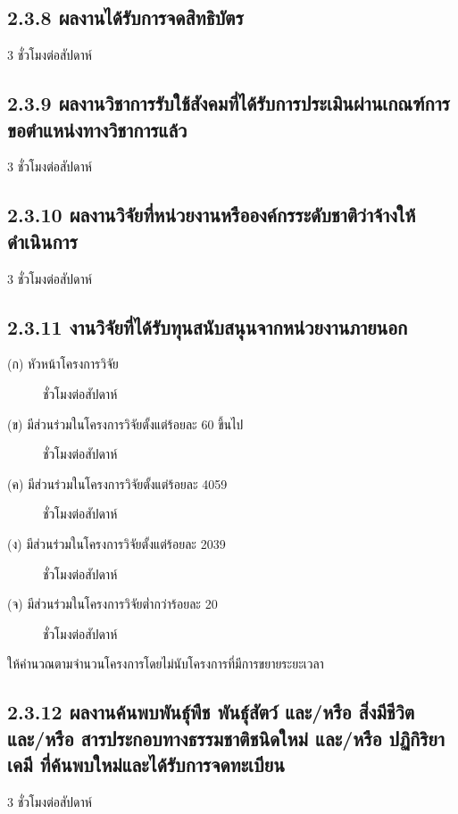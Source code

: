 \documentclass[a4paper,12pt,english]{sphinxmanual}
\begin{document}
\subsection{2.3.8 ผลงานได้รับการจดสิทธิบัตร}
\label{\detokenize{2research:id18}}
3 ชั่วโมงต่อสัปดาห์


\subsection{2.3.9 ผลงานวิชาการรับใช้สังคมที่ได้รับการประเมินผ่านเกณฑ์การขอตำแหน่งทางวิชาการแล้ว}
\label{\detokenize{2research:id19}}
3 ชั่วโมงต่อสัปดาห์


\subsection{2.3.10 ผลงานวิจัยที่หน่วยงานหรือองค์กรระดับชาติว่าจ้างให้ดำเนินการ}
\label{\detokenize{2research:id20}}
3 ชั่วโมงต่อสัปดาห์


\subsection{2.3.11 งานวิจัยที่ได้รับทุนสนับสนุนจากหน่วยงานภายนอก}
\label{\detokenize{2research:id21}}\begin{description}
\item[{(ก) หัวหน้าโครงการวิจัย}]  ชั่วโมงต่อสัปดาห์

\item[{(ข) มีส่วนร่วมในโครงการวิจัยตั้งแต่ร้อยละ 60 ขึ้นไป}]  ชั่วโมงต่อสัปดาห์

\item[{(ค) มีส่วนร่วมในโครงการวิจัยตั้งแต่ร้อยละ 40\sphinxhyphen{}59}]  ชั่วโมงต่อสัปดาห์

\item[{(ง) มีส่วนร่วมในโครงการวิจัยตั้งแต่ร้อยละ 20\sphinxhyphen{}39}]  ชั่วโมงต่อสัปดาห์

\item[{(จ) มีส่วนร่วมในโครงการวิจัยต่ำกว่าร้อยละ 20}]  ชั่วโมงต่อสัปดาห์

\end{description}

ให้คำนวณตามจำนวนโครงการโดยไม่นับโครงการที่มีการขยายระยะเวลา


\subsection{2.3.12 ผลงานค้นพบพันธุ์พืช พันธุ์สัตว์ และ/หรือ สิ่งมีชีวิต และ/หรือ สารประกอบทางธรรมชาติชนิดใหม่ และ/หรือ ปฏิกิริยาเคมี ที่ค้นพบใหม่และได้รับการจดทะเบียน}
\label{\detokenize{2research:id22}}
3 ชั่วโมงต่อสัปดาห์
\end{document}
